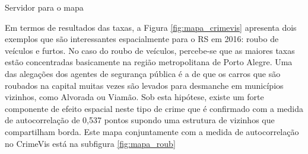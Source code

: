 \documentclass[12pt,openright,oneside,a4paper,english,french,spanish]{abntex2}
\numberwithin{table}{section} %
\numberwithin{figure}{section} %
\begin{document}
\begin{rcode}
\begin{Schunk}
\end{Schunk}
\caption{Servidor para o mapa}
\label{code:server_mapa}
\end{rcode}

Em termos de resultados das taxas, a Figura \ref{fig:mapa_crimevis} apresenta dois exemplos que são interessantes espacialmente para o RS em 2016: roubo de veículos e furtos. No caso do roubo de veículos, percebe-se que as maiores taxas estão concentradas basicamente na região metropolitana de Porto Alegre. Uma das alegações dos agentes de segurança pública é a de que os carros que são roubados na capital muitas vezes são levados para desmanche em municípios vizinhos, como Alvorada ou Viamão. Sob esta hipótese, existe um forte componente de efeito espacial neste tipo de crime que é confirmado com a medida de autocorrelação de 0,537 pontos supondo uma estrutura de vizinhos que compartilham borda. Este mapa conjuntamente com a medida de autocorrelação no CrimeVis está na subfigura \ref{fig:mapa_roub} 
\end{document}
